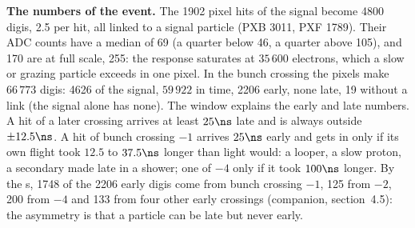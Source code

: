 \textbf{The numbers of the event.} The 1902 pixel hits of the signal become 4800 digis, 2.5 per hit, all linked to a
signal particle (PXB 3011, PXF 1789). Their ADC counts have a median of 69 (a quarter below 46, a quarter above 105),
and 170 are at full scale, 255: the response saturates at $35\,600$ electrons, which a slow or grazing particle exceeds
in one pixel. In the bunch crossing the pixels make $66\,773$ digis: 4626 of the signal, $59\,922$ in time, 2206 early,
none late, 19 without a link (the signal alone has none). The window explains the early and late numbers. A hit of a
later crossing arrives at least $25\ns$ late and is always outside $\pm12.5\ns$. A hit of bunch crossing $-1$ arrives
$25\ns$ early and gets in only if its own flight took $12.5$ to $37.5\ns$ longer than light would: a looper, a slow
proton, a secondary made late in a shower; one of $-4$ only if it took $100\ns$ longer. By the s, 1748
of the 2206 early digis come from bunch crossing $-1$, 125 from $-2$, 200 from $-4$ and 133 from four other early
crossings (companion, section~4.5): the asymmetry is that a particle can be late but never early.

